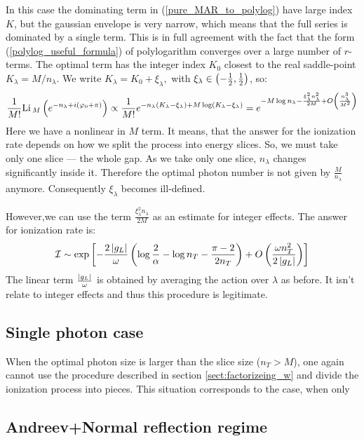In this
case the dominating term in (\ref{pure_MAR_to_polylog}) have large index $K$, but the gaussian
envelope is very narrow, which means that the
full series is dominated by a single term. This is in full agreement
with the fact that the form (\ref{polylog_useful_formula}) of polylogarithm  converges
over a large number of $r$-terms. The optimal
term has the integer index $K_{0}$ closest to the real saddle-point
$K_{\lambda}=M/ n_\lambda$. We write $
K_{\lambda}=K_{0}+\xi_\lambda,$ with $\xi_\lambda \in \left(-\frac{1}{2}, \frac{1}{2}\right)$, so:
\begin{gather}
\label{pure_mar_slice_shit}
\frac{1}{M!}
	\mathrm{Li}\,_M
	\left(
	e^{-n_\lambda+i\left(\varphi_0+\pi\right)}\right)
	\propto
	\frac{1}{M!}
	e^{-n_\lambda
		\left(K_\lambda-\xi_\lambda\right)
	+
	M
	\log  \left(K_\lambda-\xi_\lambda\right)
	}
	=
	e^{- M\log{n_\lambda}
		-
		\frac{\xi_\lambda^2 n_\lambda^2}{2M}
		+
		O\left(\frac{n_\lambda^3}{M^2}\right)
	}
\end{gather}
Here we have a nonlinear in $ M $ term. It means, that the answer for the ionization rate depends on how we split the process into energy slices. So, we must take only one slice --- the whole gap. As we take only one slice, $ n_\lambda $ changes significantly inside it. Therefore the optimal photon number is not given by $ \frac{M}{n_\lambda} $ anymore. Consequently $\xi_\lambda $ becomes ill-defined. 

However,we can use the term $ \frac{\xi_\lambda^2 n_\lambda}{2M} $ as an estimate for integer effects. The answer for ionization rate is:
\begin{gather}
	\mathcal{I}
	\sim
	\exp
	\left[
		-\frac{2\left|g_L\right|}{\omega}
		\left(
			\log\frac{2}{\alpha}
			-
				\log n_T
			-
			\frac{\pi-2}{2n_T}
		\right)
	+
		O\left(	
			\frac{\omega n_T^2}{2\left|g_L\right|}\right)
	\right]
\end{gather}
The linear term $ \frac{\left|g_L\right|}{\omega} $ is obtained by averaging the action over $ \lambda $ as before. It isn't relate to integer effects and thus this procedure is legitimate.
\subsection{Single photon case}
\label{subsect:single_photon}


When the optimal photon size is larger than the slice size ($ n_T>M $), one again cannot use the procedure described in section \ref{sect:factorizeing_w} and divide the ionization process into pieces. This situation corresponds to the case, when only
\subsection{Andreev+Normal reflection regime}

